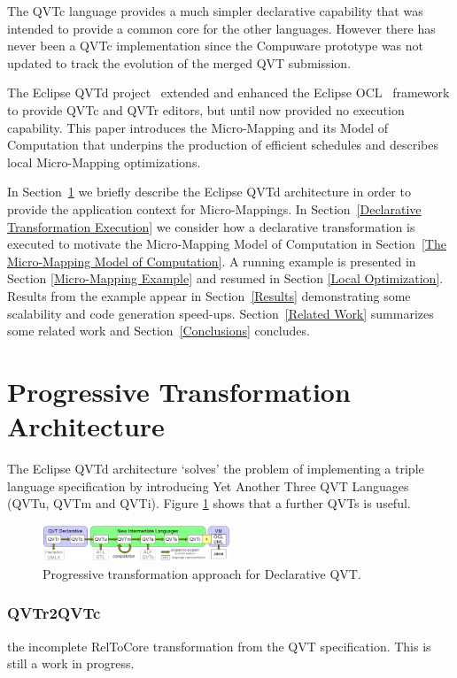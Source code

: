 \documentclass[conference]{IEEEtran}
\begin{document}
The QVTc language provides a much simpler declarative capability that was intended to provide a common core for the other languages. However there has never been a QVTc implementation since the Compuware prototype was not updated to track the evolution of the merged QVT submission.

The Eclipse QVTd project~\cite{Eclipse-QVTd} extended and enhanced the Eclipse OCL~\cite{Eclipse-OCL} framework to provide QVTc and QVTr editors, but until now provided no execution capability. This paper introduces the Micro-Mapping and its Model of Computation that underpins the production of efficient schedules and describes local Micro-Mapping optimizations.

In Section~\ref{Architecture} we briefly describe the Eclipse QVTd architecture in order to provide the application context for Micro-Mappings. In Section~\ref{Declarative Transformation Execution} we consider how a declarative transformation is executed to motivate the Micro-Mapping Model of Computation in Section~\ref{The Micro-Mapping Model of Computation}. A running example is presented in Section \ref{Micro-Mapping Example} and resumed in Section \ref {Local Optimization}. Results from the example appear in Section~\ref{Results} demonstrating some scalability and code generation speed-ups. Section~\ref{Related Work} summarizes some related work and Section~\ref{Conclusions} concludes.

\section{Progressive Transformation Architecture}\label{Architecture}

The Eclipse QVTd architecture `solves' the problem of implementing a triple language specification by introducing Yet Another Three QVT Languages\cite{ya3qvt} (QVTu, QVTm and QVTi). Figure \ref{fig:architecture} shows that a further QVTs is useful.

\begin{figure}[h]
	\centering
	\includegraphics[width=0.5\textwidth]{QVThorizontalAlphabet.png}
	\caption{Progressive transformation approach for Declarative QVT.}
	\label{fig:architecture}
\end{figure}

\subsubsection{QVTr2QVTc} the incomplete RelToCore transformation from the QVT specification. This is still a work in progress.
\end{document}
